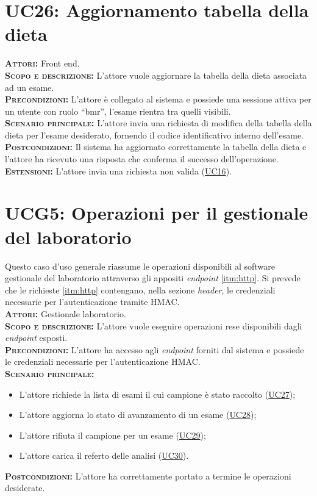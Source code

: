 \section{UC26: Aggiornamento tabella della dieta}
\label{sec:UC26}
\textsc{\textbf{Attori:}} Front end.\\
\textsc{\textbf{Scopo e descrizione:}} L'attore vuole aggiornare la tabella della dieta associata ad un esame.\\
\textsc{\textsc{\textbf{Precondizioni:}}} L'attore è collegato al sistema e possiede una sessione attiva per un utente con ruolo ``bmr'', l'esame rientra tra quelli visibili.\\
\textsc{\textbf{Scenario principale:}}  L'attore invia una richiesta di modifica della tabella della dieta per l'esame desiderato, fornendo il codice identificativo interno dell'esame.\\
\textsc{\textbf{Postcondizioni:}} Il sistema ha aggiornato correttamente la tabella della dieta e l'attore ha ricevuto una risposta che conferma il successo dell'operazione.\\
\textsc{\textbf{Estensioni:}} L'attore invia una richiesta non valida (\hyperref[sec:UC16]{UC16}).

\section{UCG5: Operazioni per il gestionale del laboratorio}
\label{sec:UCG5}
Questo caso d'uso generale riassume le operazioni disponibili al software gestionale del laboratorio attraverso gli appositi \textit{endpoint} \ref{itm:http}. Si prevede che le richieste \ref{itm:http} contengano, nella sezione \textit{header}, le credenziali necessarie per l'autenticazione tramite HMAC.\\ 
\textsc{\textbf{Attori:}} Gestionale laboratorio.\\
\textsc{\textbf{Scopo e descrizione:}} L'attore vuole eseguire operazioni rese disponibili dagli \textit{endpoint} esposti.\\
\textsc{\textbf{Precondizioni:}} L'attore ha accesso agli \textit{endpoint} forniti dal sistema e possiede le credenziali necessarie per l'autenticazione HMAC.\\
\textsc{\textbf{Scenario principale:}} 
\begin{itemize}
    \item L'attore richiede la lista di esami il cui campione è stato raccolto (\hyperref[sec:UC27]{UC27});
    \item L'attore aggiorna lo stato di avanzamento di un esame (\hyperref[sec:UC28]{UC28});
    \item L'attore rifiuta il campione per un esame (\hyperref[sec:UC29]{UC29});
    \item L'attore carica il referto delle analisi (\hyperref[sec:UC30]{UC30}).
\end{itemize}
\textsc{\textbf{Postcondizioni:}} L'attore ha correttamente portato a termine le operazioni desiderate.

